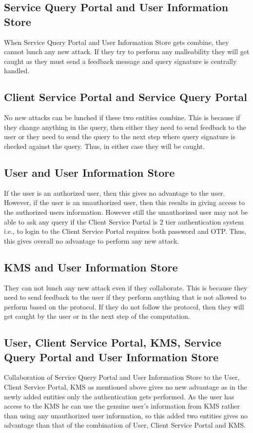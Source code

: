 \subsection{Service Query Portal and User Information Store} When Service Query Portal and User Information Store gets combine, they cannot lunch any new attack. If they try to perform any malleability they will get caught as they must send a feedback message and query signature is centrally handled.

\subsection{Client Service Portal and Service Query Portal} No new attacks can be lunched if these two entities combine. This is because if they change anything in the query, then either they need to send feedback to the user or they need to send the query to the next step where query signature is checked against the query. Thus, in either case they will be caught.

\subsection{User and User Information Store} If the user is an authorized user, then this gives no advantage to the user. However, if the user is an unauthorized user, then this results in giving access to the authorized users information. However still the unauthorized user may not be able to ask any query if the Client Service Portal is 2 tier authentication system i.e., to login to the Client Service Portal requires both password and OTP.  Thus, this gives overall no advantage to perform any new attack.

\subsection{KMS and User Information Store} They can not lunch any new attack even if they collaborate. This is because they need to send feedback to the user if they perform anything that is not allowed to perform based on the protocol. If they do not follow the protocol, then they will get caught by the user or in the next step of the computation.

\subsection{User, Client Service Portal, KMS, Service Query Portal and User Information Store} Collaboration of Service Query Portal and User Information Store to the User, Client Service Portal, KMS as mentioned above gives no new advantage as in the newly added entities only the authentication gets performed. As the user has access to the KMS he can use the genuine user’s information from KMS rather than using any unauthorized user information, so this added two entities gives no advantage than that of the combination of User, Client Service Portal and KMS.

